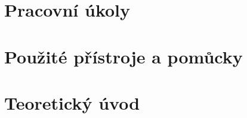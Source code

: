 \section{Pracovní úkoly}

\begin{compactenum}
\end{compactenum}
%
\section{Použité přístroje a pomůcky}

%
\section{Teoretický úvod}
% 
% 
% 
% 
% 
%
